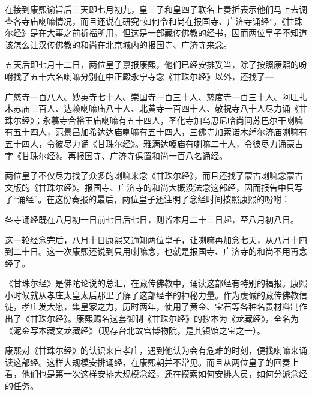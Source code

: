 在接到康熙谕旨后三天即七月初九，皇三子和皇四子联名上奏折表示他们马上去调查各寺庙喇嘛情况，而且还说在研究“如何令和尚在报国寺、广济寺诵经”。《甘珠尔经》是在大事之前祈福所用，但这是一部藏传佛教的经书，因而两位皇子不知道该怎么让汉传佛教的和尚在北京城内的报国寺、广济寺来念。



五天后即七月十二日，两位皇子禀报康熙，他们已经安排妥当，除了按照康熙的吩咐找了五十六名喇嘛分别在中正殿永宁寺念《甘珠尔经》以外，还找了—



\begin{bookquote}广慈寺一百八人、妙英寺七十人、崇国寺一百三十人、慈度寺一百三十人、阿旺扎木苏庙三百人、达赖喇嘛庙八十人、北黄寺一百四十人、敬祝寺八十人尽力诵《甘珠尔经》；永慕寺合裕王庙喇嘛有五十四人，圣化寺加乌思尼哈尚间苏巴尔干喇嘛有五十四人，范景昌加希达达庙喇嘛有五十四人，三佛寺加索诺木绰尔济庙喇嘛有五十四人，令彼尽力诵《甘珠尔经》。雅满达嗄庙有喇嘛二十人，令彼尽力诵蒙古字《甘珠尔经》。再报国寺、广济寺俱置和尚一百八名诵经。\end{bookquote}


两位皇子不仅尽力找了众多的喇嘛来念《甘珠尔经》，而且还找了蒙古喇嘛念蒙古文版的《甘珠尔经》。报国寺、广济寺的和尚大概没法念这部经，因而报告中只写了“诵经”。在这份奏报的最后，两位皇子还注明了念经时间按照康熙的吩咐：



\begin{bookquote}各寺诵经既在八月初一日前七日后七日，则皆本月二十三日起，至八月初八日。\end{bookquote}


这一轮经念完后，八月十日康熙又通知两位皇子，让喇嘛再加念七天，从八月十四到二十日。这一次康熙还说到只用喇嘛念，也就是报国寺、广济寺的和尚不用再念经了。



《甘珠尔经》是佛陀论说的总汇，在藏传佛教中，诵读这部经有特别的福报。康熙小时候就从孝庄太皇太后那里了解了这部经书的神秘力量。作为虔诚的藏传佛教信徒，孝庄发大愿，集皇家之力，历时两年，使用了黄金、宝石等各种名贵材料制作出了《甘珠尔经》。康熙赐名这套御制《甘珠尔经》的抄本为《龙藏经》，全名为《泥金写本藏文龙藏经》（现存台北故宫博物院，是其镇馆之宝之一）。



康熙对《甘珠尔经》的认识来自孝庄，遇到他认为会有危难的时刻，便找喇嘛来诵读这部经。这样大规模安排诵经，在康熙朝并不常见。而且从两位皇子的回奏上看，他们也是第一次这样安排大规模念经，还在摸索如何安排人员，如何分派念经的任务。



